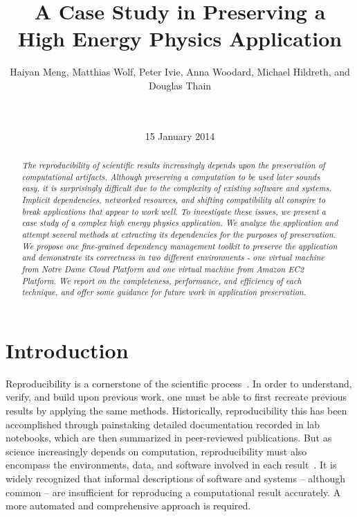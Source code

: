 \documentclass{sig-alternate}
\begin{document}
\title{A Case Study in Preserving a\\High Energy Physics Application}
\author{
Haiyan Meng, Matthias Wolf, Peter Ivie, Anna Woodard, Michael Hildreth, and Douglas Thain\\
\\
\\
}
\date{15 January 2014}
\maketitle

\begin{abstract}
\it The reproducibility of scientific results increasingly
depends upon the preservation of computational artifacts.
Although preserving a computation to be used later sounds
easy, it is surprisingly difficult due to the complexity
of existing software and systems.  Implicit dependencies,
networked resources, and shifting compatibility all conspire
to break applications that appear to work well.  To investigate
these issues, we present a case study of a complex high energy
physics application.  We analyze the application and attempt
several methods at extracting its dependencies for the purposes
of preservation. 
We propose one fine-grained dependency management toolkit to preserve the application and demonstrate its correctness in two different environments - one virtual machine from Notre Dame Cloud Platform and one virtual machine from Amazon EC2 Platform. 
We report on the completeness, performance,
and efficiency of each technique, and offer some guidance for
future work in application preservation.
\end{abstract}



\section{Introduction}

Reproducibility is a cornerstone of the scientific process~\cite{borgman2012data}.
In order to understand, verify, and build upon previous work,
one must be able to first recreate previous results by applying
the same methods. Historically, reproducibility this has been
accomplished through painstaking detailed documentation recorded
in lab notebooks, which are then summarized in peer-reviewed publications.
But as science increasingly depends on computation,
reproducibility must also encompass the environments, data, and software
involved in each result~\cite{zabolitzky2002preserving}. It is widely recognized that informal
descriptions of software and systems -- although common -- are insufficient
for reproducing a computational result accurately.
A more automated and comprehensive approach is required.
\end{document}
